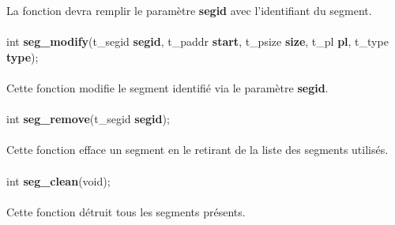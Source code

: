 \documentclass[10pt,a4wide]{article}
\begin{document}
La fonction devra remplir le param\`etre \textbf{segid} avec l'identifiant
du segment.

\paragraph{}

\hspace{1.5cm}int \textbf{seg\_modify}(t\_segid \textbf{segid},
                                       t\_paddr \textbf{start},
                                       t\_psize \textbf{size},
                                       t\_pl \textbf{pl},
                                       t\_type \textbf{type});

\paragraph{}

Cette fonction modifie le segment identifi\'e via le param\`etre
\textbf{segid}.

\paragraph{}

\hspace{1.5cm}int \textbf{seg\_remove}(t\_segid \textbf{segid});

\paragraph{}

Cette fonction efface un segment en le retirant de la liste des segments
utilis\'es.

\paragraph{}

\hspace{1.5cm}int \textbf{seg\_clean}(void);

\paragraph{}

Cette fonction d\'etruit tous les segments pr\'esents.

\paragraph{}
\end{document}
